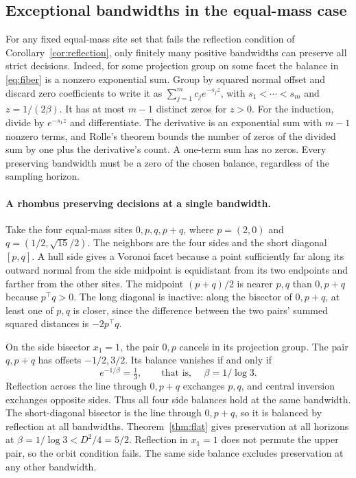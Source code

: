 \subsection{Exceptional bandwidths in the equal-mass case}
\label{sec:exceptional-bandwidths}

For any fixed equal-mass site set that fails the reflection condition
of Corollary~\ref{cor:reflection}, only finitely many positive bandwidths
can preserve all strict decisions. Indeed, for some projection group
on some facet the balance in \eqref{eq:fiber} is a nonzero exponential
sum. Group by squared normal offset and discard zero coefficients to
write it as $\sum_{j=1}^m c_j e^{-s_j z}$, with $s_1<\cdots<s_m$ and
$z=1/(2\beta)$. It has at most $m-1$ distinct zeros for $z>0$. For the
induction, divide by $e^{-s_1 z}$ and differentiate. The derivative is
an exponential sum with $m-1$ nonzero terms, and Rolle's theorem bounds
the number of zeros of the divided sum by one plus the derivative's
count. A one-term sum has no zeros. Every preserving bandwidth must
be a zero of the chosen balance, regardless of the sampling horizon.

\paragraph{A rhombus preserving decisions at a single bandwidth.}
Take the four equal-mass sites $0,p,q,p+q$, where $p=(2,0)$ and
$q=(1/2,\sqrt{15}/2)$. The neighbors are the four sides and the short
diagonal $[p,q]$. A hull side gives a Voronoi facet because a point
sufficiently far along its outward normal from the side midpoint is
equidistant from its two endpoints and farther from the other sites.
The midpoint $(p+q)/2$ is nearer $p,q$ than $0,p+q$ because
$p^\top q>0$. The long diagonal is inactive: along the bisector of
$0,p+q$, at least one of $p,q$ is closer, since the difference between
the two pairs' summed squared distances is $-2p^\top q$.

On the side bisector $x_1=1$, the pair $0,p$ cancels in its projection
group. The pair $q,p+q$ has offsets $-1/2,3/2$. Its balance vanishes
if and only if
\[
 e^{-1/\beta}=\tfrac13,
 \qquad\text{that is, }\quad \beta=1/\log 3.
\]
Reflection across the line through $0,p+q$ exchanges $p,q$, and
central inversion exchanges opposite sides. Thus all four side
balances hold at the same bandwidth. The short-diagonal bisector is
the line through $0,p+q$, so it is balanced by reflection at all
bandwidths. Theorem~\ref{thm:flat} gives preservation at all horizons
at $\beta=1/\log 3<D^2/4=5/2$. Reflection in $x_1=1$ does not permute
the upper pair, so the orbit condition fails. The same side balance
excludes preservation at any other bandwidth.
